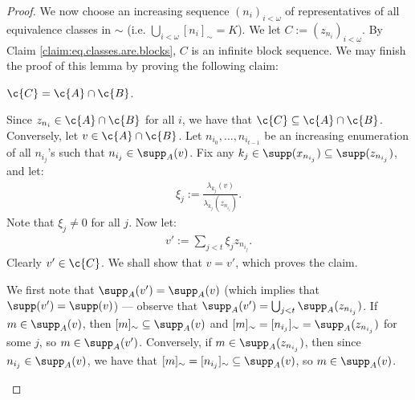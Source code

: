 \documentclass[11pt,reqno]{amsart}
\begin{document}
\begin{proof}
    We now choose an increasing sequence $(n_i)_{i<\omega}$ of representatives of all equivalence classes in $\sim$ (i.e. $\bigcup_{i<\omega} [n_i]_\sim = K$). We let $C := (z_{n_i})_{i<\omega}$. By Claim \ref{claim:eq.classes.are.blocks}, $C$ is an infinite block sequence. We may finish the proof of this lemma by proving the following claim:

    \begin{claim}
        $\c{C} = \c{A} \cap \c{B}$.
    \end{claim}

    \begin{midproof}
        Since $z_{n_i} \in \c{A} \cap \c{B}$ for all $i$, we have that $\c{C} \subseteq \c{A} \cap \c{B}$. Conversely, let $v \in \c{A} \cap \c{B}$. Let $n_{i_0},\dots,n_{i_{t-1}}$ be an increasing enumeration of all $n_{i_j}$'s such that $n_{i_j} \in \supp_A(v)$. Fix any $k_j \in \supp(x_{n_{i_j}}) \subseteq \supp(z_{n_{i_j}})$, and let:
        \begin{align*}
            \xi_j := \frac{\lambda_{k_j}(v)}{\lambda_{k_j}(z_{n_{i_j}})}.
        \end{align*}
        Note that $\xi_j \neq 0$ for all $j$. Now let:
        \begin{align*}
            v' := \sum_{j<t} \xi_jz_{n_{i_j}}.
        \end{align*}
        Clearly $v' \in \c{C}$. We shall show that $v = v'$, which proves the claim.

        We first note that $\supp_A(v') = \supp_A(v)$ (which implies that $\supp(v') = \supp(v)$) --- observe that $\supp_A(v') = \bigcup_{j<t} \supp_A(z_{n_{i_j}})$. If $m \in \supp_A(v)$, then $[m]_\sim \subseteq \supp_A(v)$ and $[m]_\sim = [n_{i_j}]_\sim = \supp_A(z_{n_{i_j}})$ for some $j$, so $m \in \supp_A(v')$. Conversely, if $m \in \supp_A(z_{n_{i_j}})$, then since $n_{i_j} \in \supp_A(v)$, we have that $[m]_\sim = [n_{i_j}]_\sim \subseteq \supp_A(v)$, so $m \in \supp_A(v)$. 


\end{midproof}
\end{proof}
\end{document}

